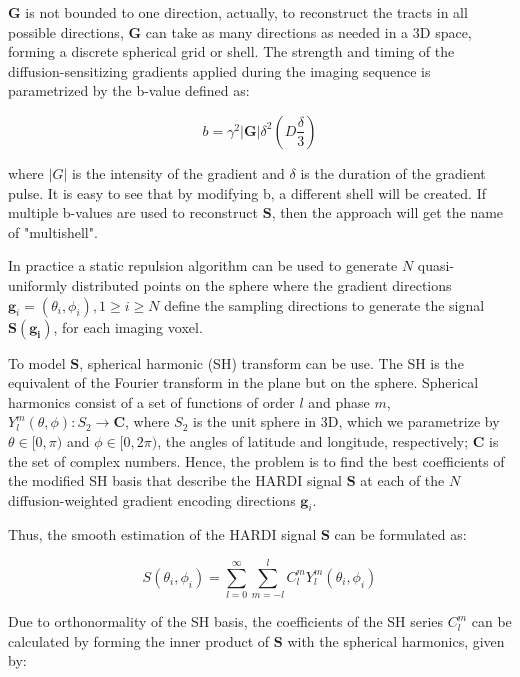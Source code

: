 \documentclass{cys}
\begin{document}
\bigskip
$\mathbf{G}$ is not bounded to one direction, actually, to reconstruct the tracts in all possible directions, $\mathbf{G}$ can take as many directions as needed in a 3D space, forming a discrete spherical grid or shell. The strength and timing of the diffusion-sensitizing gradients applied during the imaging sequence is parametrized by the b-value defined as:

\begin{equation}
b = \gamma^2 |\mathbf{G}|\delta^2\left( D \frac{\delta}{3} \right)
\end{equation}

where $\mathbf|{G}|$ is the intensity of the gradient and $\delta$ is the duration of the gradient pulse. It is easy to see that by modifying b, a different shell will be created. If multiple b-values are used to reconstruct $\mathbf{S}$, then the approach will get the name of "multishell".

\bigskip
In practice a static repulsion algorithm \cite{jones1999optimal} can be used to generate $N$ quasi-uniformly distributed points on the sphere where the gradient directions $\mathbf{g}_i=(\theta_i,\phi_i), 1\ge i \ge N $ define the sampling directions to generate the signal $\mathbf{S}(\mathbf{g_i})$, for each imaging voxel. %


\bigskip
To model $\mathbf{S}$, spherical harmonic (SH) transform can be use. The SH \cite{nikiforov1988special} is the equivalent of the Fourier transform in the plane but on the sphere. Spherical harmonics consist of a set of functions of order $l$ and phase $m$, $Y_l^m (\theta,\phi): S_2 \rightarrow \mathbf{C} $, where $S_2$ is the unit sphere in 3D, which we parametrize by $\theta \in [0,\pi)$ and $\phi \in [0, 2\pi)$, the angles of latitude and longitude, respectively; $\mathbf{C}$ is the set of complex numbers. Hence, the problem is to find the best coefficients of the modified SH basis that describe the HARDI signal $\mathbf{S}$ at each of the $N$ diffusion-weighted gradient encoding directions $\mathbf{g}_i$.

\bigskip
Thus, the smooth estimation of the HARDI signal $\mathbf{S}$ can be formulated as:

\begin{equation}
\label{SignalS}
S(\theta_i,\phi_i)=\sum_{l=0}^\infty \sum_{m=-l}^l C_l^m Y_l^m(\theta_i,\phi_i)
\end{equation}

Due to orthonormality of the SH basis, the coefficients of the SH series $C_l^m$ can be calculated by forming the inner product of $\mathbf{S}$ with the spherical harmonics, given by:
\end{document}
